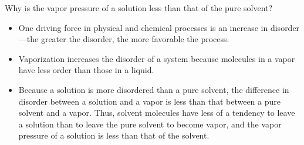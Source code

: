 \documentclass[a4paper,12pt,twocolumn]{article}
\begin{document}
\begin{Box2}{}
{\large Why is the vapor pressure of a solution less than that of the pure solvent?}
\end{Box2}
\begin{itemize}
\item One driving force in physical and chemical processes is an increase in disorder—the greater the disorder, the more favorable the process.
\item Vaporization increases the disorder of a system because molecules in a vapor have less order than those in a liquid. 
\item Because a solution is more disordered than a pure solvent, the difference in disorder between a solution and a vapor is less than that between a pure solvent and a vapor. Thus, solvent molecules have less of a tendency to leave a solution than to leave the pure solvent to become vapor, and the vapor pressure of a solution is less than that of the solvent.
\end{itemize}
\end{document}
